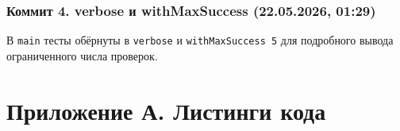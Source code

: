 \documentclass[a4paper, final]{article}
\begin{document}
\subsubsection{Коммит 4. verbose и withMaxSuccess (22.05.2026, 01:29)}

В \texttt{main} тесты обёрнуты в \texttt{verbose} и \texttt{withMaxSuccess 5}
для подробного вывода ограниченного числа проверок.


\newpage
\appendix
\section{Приложение А. Листинги кода}

\end{document}

